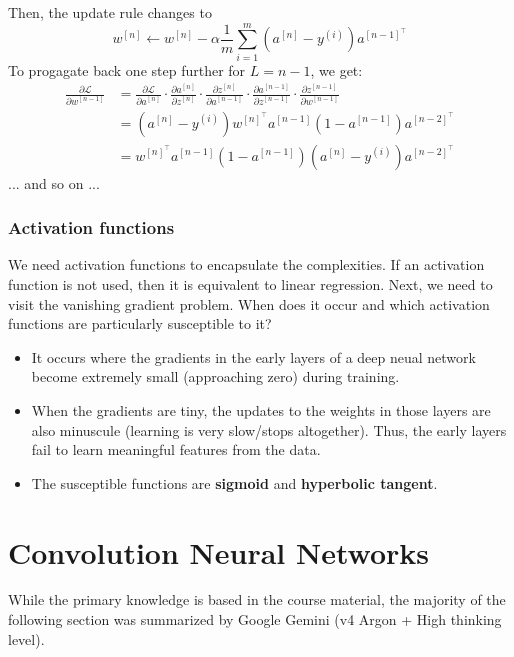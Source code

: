 \documentclass[11pt]{article}
\begin{document}
\begin{note_special}
Then, the update rule changes to
$$
w^{[n]}\leftarrow w^{[n]}-\alpha\frac{1}{m}\sum_{i=1}^{m}(a^{[n]}-y^{(i)})a^{[n-1]^{\top}}
$$
To progagate back one step further for $L=n-1$, we get:
\begin{align*}
    \frac{\partial\mathcal{L}}{\partial w^{[n-1]}}&=\frac{\partial\mathcal{L}}{\partial a^{[n]}}\cdot\frac{\partial a^{[n]}}{\partial z^{[n]}}\cdot\frac{\partial z^{[n]}}{\partial a^{[n-1]}}\cdot\frac{\partial a^{[n-1]}}{\partial z^{[n-1]}}\cdot\frac{\partial z^{[n-1]}}{\partial w^{[n-1]}} \\
    &=(a^{[n]}-y^{(i)})w^{[n]^{\top}}a^{[n-1]}(1-a^{[n-1]})a^{[n-2]^{\top}} \\
    &=w^{[n]^{\top}}a^{[n-1]}(1-a^{[n-1]})(a^{[n]}-y^{(i)})a^{[n-2]^{\top}}
\end{align*}
... and so on ...
\end{note_special}

\subsubsection{Activation functions}
We need activation functions to encapsulate the complexities. If an activation function is not used, then it is equivalent to linear regression.
Next, we need to visit the vanishing gradient problem. When does it occur and which activation functions are particularly susceptible to it?
\begin{itemize}
    \item It occurs where the gradients in the early layers of a deep neual network become extremely small (approaching zero) during training.
    \item When the gradients are tiny, the updates to the weights in those layers are also minuscule (learning is very slow/stops altogether). Thus, the early layers fail to learn meaningful features from the data.
    \item The susceptible functions are \textbf{sigmoid} and \textbf{hyperbolic tangent}.
\end{itemize}

\section{Convolution Neural Networks}
\begin{note}[AI usage]
While the primary knowledge is based in the course material, the majority of the following section was summarized by Google Gemini (v4 Argon + High thinking level).
\end{note}
\end{document}
